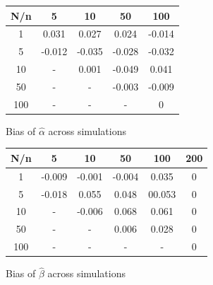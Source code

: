 \documentclass{article} %
\numberwithin{equation}{section} %
\numberwithin{figure}{section} %
\numberwithin{table}{section} %
\begin{document}
\begin{figure}[h] \label{bias_alpha}
\begin{center}
\begin{tabular}{ |c|c|c|c|c| }
 \hline
 N/n & 5 & 10 & 50 & 100  \\
 \hline
 1 & 0.031 & 0.027 & 0.024 & -0.014  \\
 \hline
 5 & -0.012 & -0.035 & -0.028 & -0.032  \\
 \hline
 10 & - & 0.001 & -0.049 & 0.041  \\
 \hline
 50 & - & - & -0.003 & -0.009  \\
 \hline
 100 & - & - & - & 0  \\
 \hline
\end{tabular}
\end{center}
\caption{Bias of $\hat{\alpha}$ across simulations}
\end{figure}

\begin{figure}[h] \label{bias_alpha}
\begin{center}
\begin{tabular}{ |c|c|c|c|c|c| }
 \hline
 N/n & 5 & 10 & 50 & 100 & 200 \\
 \hline
 1 & -0.009 & -0.001 & -0.004 & 0.035 & 0\\
 \hline
 5 & -0.018 & 0.055 & 0.048 & 00.053 &  0\\
 \hline
 10 & - & -0.006 & 0.068 & 0.061 & 0 \\
 \hline
 50 & - & - & 0.006 & 0.028  & 0\\
 \hline
 100 & - & - & - & -  & 0\\
 \hline
\end{tabular}
\caption{Bias of $\hat{\beta}$ across simulations}
\end{center}
\end{figure}
\end{document}
